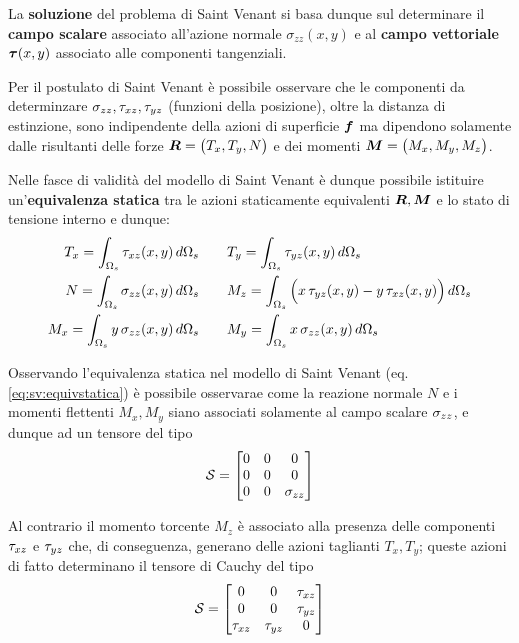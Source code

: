 	\begin{concetto}
		La \textbf{soluzione} del problema di Saint Venant si basa dunque sul determinare il \textbf{campo scalare} associato all'azione normale $\sigma_{zz}(x,y)$ e al \textbf{campo vettoriale} $\boldsymbol{\tau}(x,y)$ associato alle componenti tangenziali.
	\end{concetto}

	Per il postulato di Saint Venant è possibile osservare che le componenti da determinzare $\sigma_{zz},\tau_{xz},\tau_{yz}$ (funzioni della posizione), oltre la distanza di estinzione, sono indipendente della azioni di superficie $\boldsymbol{f}$ ma dipendono solamente dalle risultanti delle forze $\boldsymbol{R} = \big(T_x,T_y,N\big)$ e dei momenti $\boldsymbol{M} = \big(M_x, M_y, M_z\big)$.
	
	\begin{concetto}
		Nelle fasce di validità del modello di Saint Venant è dunque possibile istituire un'\textbf{equivalenza statica} tra le azioni staticamente equivalenti $\boldsymbol{R},\boldsymbol{M}$ e lo stato di tensione interno e dunque:
		\begin{equation} \label{eq:sv:equivstatica}
		\begin{split}
			T_x = \int_{\Omega_s} \tau_{xz}(x,y)\, d\Omega_s  \qquad & T_y =  \int_{\Omega_s} \tau_{yz}(x,y)\, d\Omega_s \\
			N = \int_{\Omega_s} \sigma_{zz}(x,y)\, d\Omega_s \qquad & M_z = \int_{\Omega_s} \Big(x\, \tau_{yz}(x,y) - y\,\tau_{xz}(x,y)\Big) \, d\Omega_s \\
			M_x = \int_{\Omega_s}y \, \sigma_{zz}(x,y)\, d\Omega_s \qquad & M_y = \int_{\Omega_s}x \, \sigma_{zz}(x,y)\, d\Omega_s \\
		\end{split}
		\end{equation}
	\end{concetto}
	\begin{osservazione}
		Osservando l'equivalenza statica nel modello di Saint Venant (eq. \ref{eq:sv:equivstatica}) è possibile osservarae come la reazione normale $N$ e i momenti flettenti $M_x,M_y$ siano associati solamente al campo scalare $\sigma_{zz}$, e dunque ad un tensore del tipo
		\[\mathcal S = \begin{bmatrix}
			0 & 0 & 0 \\ 0 & 0 & 0 \\ 0 & 0 & \sigma_{zz}
		\end{bmatrix}\]
		
		Al contrario il momento torcente $M_z$ è associato alla presenza delle componenti $\tau_{xz}$ e $\tau_{yz}$ che, di conseguenza, generano delle azioni taglianti $T_x,T_y$; queste azioni di fatto determinano il tensore di Cauchy del tipo
		\[\mathcal S = \begin{bmatrix}
		0 & 0 & \tau_{xz} \\ 0 & 0 & \tau_{yz} \\ \tau_{xz} & \tau_{yz} & 0
		\end{bmatrix}\]
		
	\end{osservazione}
	
